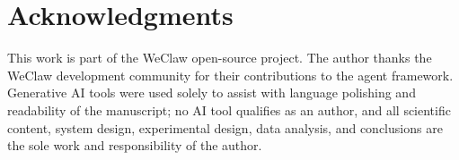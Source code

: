 \documentclass[numbered,mediumone,traditional]{oup-authoring-template}
\begin{document}
\section*{Acknowledgments}

This work is part of the WeClaw open-source project. The author thanks the WeClaw development community for their contributions to the agent framework. Generative AI tools were used solely to assist with language polishing and readability of the manuscript; no AI tool qualifies as an author, and all scientific content, system design, experimental design, data analysis, and conclusions are the sole work and responsibility of the author.

\end{document}
